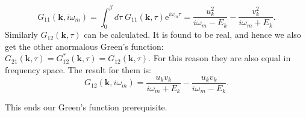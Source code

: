 \begin{equation}
G_{11}(\mathbf{k},i\omega_m) = \int_0^\beta d\tau \; G_{11}(\mathbf{k},\tau) \text{e}^{i\omega_m\tau} = \frac{u_k^2}{i\omega_m-E_k}-\frac{v_k^2}{i\omega_m+E_k}. 
\end{equation}
Similarly $G_{12}(\mathbf{k},\tau)$ can be calculated. It is found to be real, and hence we also get the other anormalous Green's function: $G_{21}(\mathbf{k},\tau)=G_{12}^*(\mathbf{k},\tau)=G_{12}(\mathbf{k},\tau)$. For this reason they are also equal in frequency space. The result for them is:
\begin{equation}
G_{12}(\mathbf{k},i\omega_m)= \frac{u_kv_k}{i\omega_m+E_k}-\frac{u_kv_k}{i\omega_m-E_k}. 
\end{equation}

This ends our Green's function prerequisite.



